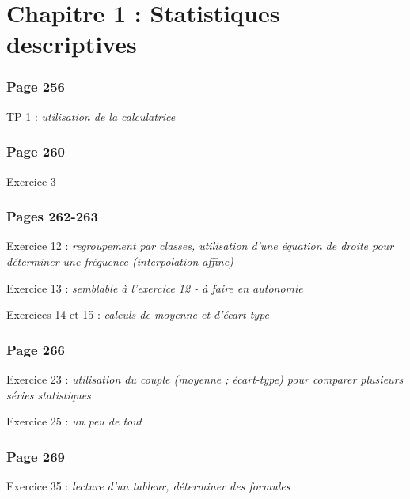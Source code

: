 \documentclass[10pt,openright,twoside,french]{book}
\begin{document}
\begin{center}
\end{center}\medskip

\section*{Chapitre 1 : Statistiques descriptives}
\subsubsection*{Page 256}
TP 1 : \textit{utilisation de la calculatrice}

\subsubsection{Page 260}
Exercice 3

\subsubsection{Pages 262-263}
Exercice 12 : \textit{regroupement par classes, utilisation d'une équation de droite pour déterminer une fréquence (interpolation affine)}\par
Exercice 13 : \textit{semblable à l'exercice 12 - à faire en autonomie}\par
Exercices 14 et 15 : \textit{calculs de moyenne et d'écart-type}

\subsubsection{Page 266}
Exercice 23 : \textit{utilisation du couple (moyenne ; écart-type) pour comparer plusieurs séries statistiques}\par
Exercice 25 : \textit{un peu de tout}

\subsubsection{Page 269}
Exercice 35 : \textit{lecture d'un tableur, déterminer des formules}
\end{document}
